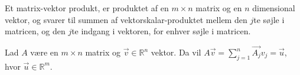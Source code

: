 Et matrix-vektor produkt, er produktet af en $m\times n$ matrix og en $n$ dimensional vektor, og svarer til summen af vektorskalar-produktet mellem den $j$te søjle i matricen, og den $j$te indgang i vektoren, for enhver søjle i matricen.
\begin{defn}
Lad $A$ være en $m\times n$ matrix og $\vec{v}\in \mathds{R}^n$ vektor. 
Da vil $A \vec{v} = \sum_{j=1}^n \vec{A_j}v_j = \vec{u}$, hvor $\vec{u} \in \mathds{R}^m$.
\label{def:matrixvektorprodukt}
\end{defn}
